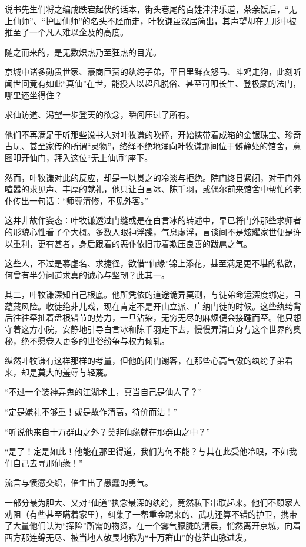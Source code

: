 说书先生们将之编成跌宕起伏的话本，街头巷尾的百姓津津乐道，茶余饭后，“无上仙师”、“护国仙师”的名头不胫而走，叶牧谦虽深居简出，其声望却在无形中被推至了一个凡人难以企及的高度。

随之而来的，是无数炽热乃至狂热的目光。

京城中诸多勋贵世家、豪商巨贾的纨绔子弟，平日里鲜衣怒马、斗鸡走狗，此刻听闻世间竟有如此“真仙”在世，能授人以超凡脱俗、甚至可叩长生、登极巅的法门，哪里还坐得住？

求仙访道、渴望一步登天的欲念，瞬间压过了所有。

他们不再满足于听那些说书人对叶牧谦的吹捧，开始携带着成箱的金银珠宝、珍奇古玩、甚至家传的所谓“灵物”，络绎不绝地涌向叶牧谦那间位于僻静处的馆舍，意图叩开仙门，拜入这位“无上仙师”座下。

然而，叶牧谦对此的反应，却是一以贯之的冷淡与拒绝。院门终日紧闭，对于门外喧嚣的求见声、丰厚的献礼，他只让白言冰、陈千羽，或偶尔前来馆舍中帮忙的老仆传出一句话：“师尊清修，不见外客。”

这并非故作姿态：叶牧谦透过门缝或是在白言冰的转述中，早已将门外那些求师者的形貌心性看了个大概。多数人眼神浮躁，气息虚浮，言谈间不是炫耀家世便是许以重利，更有甚者，身后跟着的恶仆依旧带着欺压良善的跋扈之气。

这些人，不过是慕虚名、求捷径，欲借“仙缘”锦上添花，甚至满足更不堪的私欲，何曾有半分问道求真的诚心与坚韧？此其一。

其二，叶牧谦深知自己根底。他所凭依的道途诡异莫测，与徒弟命运深度绑定，且蕴藏风险。收徒绝非儿戏，现在肯定不是开山立派、广纳门徒的时候。这些纨绔背后往往牵扯着盘根错节的势力，一旦沾染，无穷无尽的麻烦便会接踵而至。他只想守着这方小院，安静地引导白言冰和陈千羽走下去，慢慢弄清自身与这个世界的奥秘，绝不愿卷入更多的世俗纷争与权力倾轧。

纵然叶牧谦有这样那样的考量，但他的闭门谢客，在那些心高气傲的纨绔子弟看来，却是莫大的羞辱与轻蔑。

“不过一个装神弄鬼的江湖术士，真当自己是仙人了？”

“定是嫌礼不够重！或是故作清高，待价而沽！”

“听说他来自十万群山之外？莫非仙缘就在那群山之中？”

“是了！定是如此！他能在那里得道，我们为何不能？与其在此受他冷眼，不如我们自己去寻那仙缘！”

\vspace{2em}

流言与愤懑交织，催生出了愚蠢的勇气。

一部分最为胆大、又对“仙道”执念最深的纨绔，竟然私下串联起来。他们不顾家人劝阻（有些甚至瞒着家里），纠集了一帮重金聘来的、武功还算不错的护卫，携带了大量他们认为“探险”所需的物资，在一个雾气朦胧的清晨，悄然离开京城，向着西方那连绵无尽、被当地人敬畏地称为“十万群山”的苍茫山脉进发。

